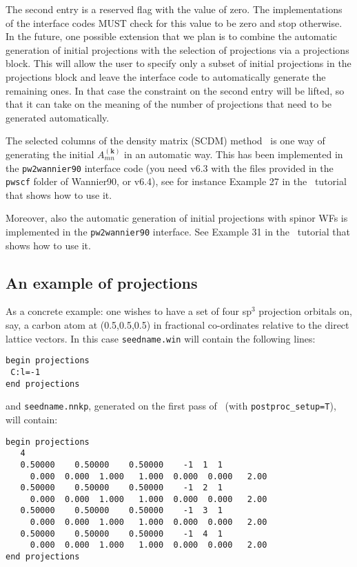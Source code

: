 The second entry is a reserved flag with the value of zero. The implementations of the interface codes MUST check for this value to be zero and stop otherwise. In the future, one possible extension that we plan is to combine the automatic generation of initial projections with the selection of projections via a projections block. This will allow the user to specify only a subset of initial projections in the projections block and leave the interface code to automatically generate the remaining ones. In that case the constraint on the second entry will be lifted, so that it can take on the meaning of the number of projections that need to be generated automatically.

The selected columns of the density matrix (SCDM) method~\cite{LinLin-ArXiv2017} is one way of generating the initial $A_{mn}^{(\mathbf{k})}$ in an automatic way. This has been implemented in the {\tt pw2wannier90} interface code (you need v6.3 with the files provided in the \texttt{pwscf} folder of Wannier90, or v6.4), see for instance Example 27 in the \wannier\ tutorial that shows how to use it.

Moreover, also the automatic generation of initial projections with spinor WFs is implemented in the {\tt pw2wannier90} interface. See Example 31 in the \wannier\ tutorial that shows how to use it.



\subsection{An example of projections}\label{sec:proj_example}

As a concrete example: one wishes to have a set of four sp$^3$ projection
orbitals on, say, a carbon atom at (0.5,0.5,0.5) in fractional
co-ordinates relative to the direct lattice vectors. In this case
\verb#seedname.win# will contain the following lines:

\begin{verbatim}
begin projections
 C:l=-1
end projections
\end{verbatim}

and \verb#seedname.nnkp#, generated on the first pass of
\wannier\ (with \verb#postproc_setup=T#), will contain: 

\begin{verbatim}
begin projections
   4
   0.50000    0.50000    0.50000    -1  1  1
     0.000  0.000  1.000   1.000  0.000  0.000   2.00 
   0.50000    0.50000    0.50000    -1  2  1
     0.000  0.000  1.000   1.000  0.000  0.000   2.00 
   0.50000    0.50000    0.50000    -1  3  1
     0.000  0.000  1.000   1.000  0.000  0.000   2.00 
   0.50000    0.50000    0.50000    -1  4  1
     0.000  0.000  1.000   1.000  0.000  0.000   2.00 
end projections
\end{verbatim}

